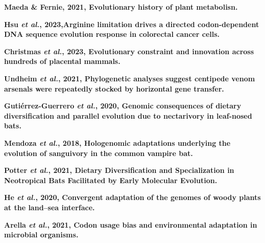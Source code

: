 \documentclass[11pt]{article}
\begin{document}
\begin{sloppypar}
\par
\textbf{Maeda & Fernie, 2021, Evolutionary history of plant metabolisn.} \newline
\par
\textbf{Hsu \textit{et al.}, 2023,Arginine limitation drives a directed codon-dependent DNA sequence evolution response in colorectal cancer cells.} \newline
\par
\textbf{Christmas \textit{et al.}, 2023, Evolutionary constraint and innovation across hundreds of placental mammals.} \newline
\par
\textbf{Undheim \textit{et al.}, 2021, Phylogenetic analyses suggest centipede venom arsenals were repeatedly stocked by horizontal gene transfer.} \newline
\par
\textbf{Gutiérrez-Guerrero \textit{et al.}, 2020, Genomic consequences of dietary diversification and parallel evolution due to nectarivory in leaf-nosed bats.} \newline
\par
\textbf{Mendoza \textit{et al.}, 2018, Hologenomic adaptations underlying the evolution of sanguivory in the common vampire bat.} \newline
\par
\textbf{Potter \textit{et al.}, 2021, Dietary Diversification and Specialization in Neotropical Bats Facilitated by Early Molecular Evolution.} \newline
\par
\textbf{He \textit{et al.}, 2020, Convergent adaptation of the genomes of woody plants at the land–sea interface.} \newline
\par
\textbf{Arella \textit{et al.}, 2021, Codon usage bias and environmental adaptation in microbial organisms.} \newline
\par

\end{sloppypar}
\end{document}
